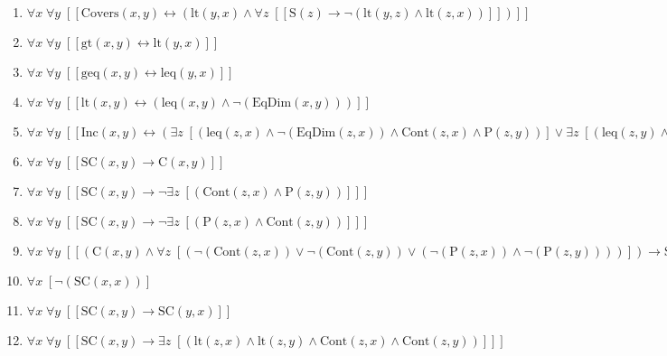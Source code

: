 \documentclass{article}
\begin{document}
\begin{enumerate}
\item $\forall x\; \forall y\;  \left[ \left[ \textrm{Covers}(x,y) \leftrightarrow \left(\textrm{lt}(y,x) \land \forall z\;  \left[ \left[ \textrm{S}(z) \rightarrow \neg \left(\textrm{lt}(y,z) \land \textrm{lt}(z,x)\right) \right] \right]\right) \right] \right]$
\item $\forall x\; \forall y\;  \left[ \left[ \textrm{gt}(x,y) \leftrightarrow \textrm{lt}(y,x) \right] \right]$
\item $\forall x\; \forall y\;  \left[ \left[ \textrm{geq}(x,y) \leftrightarrow \textrm{leq}(y,x) \right] \right]$
\item $\forall x\; \forall y\;  \left[ \left[ \textrm{lt}(x,y) \leftrightarrow \left(\textrm{leq}(x,y) \land \neg \left(\textrm{EqDim}(x,y)\right)\right) \right] \right]$
\item $\forall x\; \forall y\;  \left[ \left[ \textrm{Inc}(x,y) \leftrightarrow \left(\exists z\;  \left[ \left(\textrm{leq}(z,x) \land \neg \left(\textrm{EqDim}(z,x)\right) \land \textrm{Cont}(z,x) \land \textrm{P}(z,y)\right) \right] \lor \exists z\;  \left[ \left(\textrm{leq}(z,y) \land \neg \left(\textrm{EqDim}(z,y)\right) \land \textrm{Cont}(z,y) \land \textrm{P}(z,x)\right) \right]\right) \right] \right]$
\item $\forall x\; \forall y\;  \left[ \left[ \textrm{SC}(x,y) \rightarrow \textrm{C}(x,y) \right] \right]$
\item $\forall x\; \forall y\;  \left[ \left[ \textrm{SC}(x,y) \rightarrow \neg \exists z\;  \left[ \left(\textrm{Cont}(z,x) \land \textrm{P}(z,y)\right) \right] \right] \right]$
\item $\forall x\; \forall y\;  \left[ \left[ \textrm{SC}(x,y) \rightarrow \neg \exists z\;  \left[ \left(\textrm{P}(z,x) \land \textrm{Cont}(z,y)\right) \right] \right] \right]$
\item $\forall x\; \forall y\;  \left[ \left[ \left(\textrm{C}(x,y) \land \forall z\;  \left[ \left(\neg \left(\textrm{Cont}(z,x)\right) \lor \neg \left(\textrm{Cont}(z,y)\right) \lor \left(\neg \left(\textrm{P}(z,x)\right) \land \neg \left(\textrm{P}(z,y)\right)\right)\right) \right]\right) \rightarrow \textrm{SC}(x,y) \right] \right]$
\item $\forall x\;  \left[ \neg \left(\textrm{SC}(x,x)\right) \right]$
\item $\forall x\; \forall y\;  \left[ \left[ \textrm{SC}(x,y) \rightarrow \textrm{SC}(y,x) \right] \right]$
\item $\forall x\; \forall y\;  \left[ \left[ \textrm{SC}(x,y) \rightarrow \exists z\;  \left[ \left(\textrm{lt}(z,x) \land \textrm{lt}(z,y) \land \textrm{Cont}(z,x) \land \textrm{Cont}(z,y)\right) \right] \right] \right]$

\end{enumerate}
\end{document}
